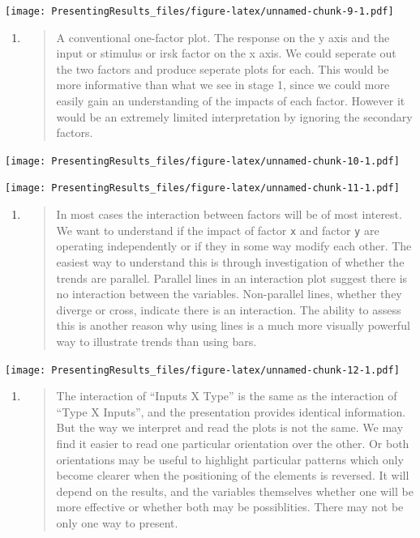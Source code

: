 \documentclass[
  titlepage]{book}
\begin{document}
\texttt{[image: PresentingResults\_files/figure-latex/unnamed-chunk-9-1.pdf]}

\begin{enumerate}
\def\labelenumi{\arabic{enumi}.}
\setcounter{enumi}{1}
\item
  \begin{quote}
  A conventional one-factor plot. The response on the y axis and the input or stimulus or irsk factor on the x axis.
  We could seperate out the two factors and produce seperate plots for each. This would be more informative than what we see in stage 1, since we could more easily gain an understanding of the impacts of each factor. However it would be an extremely limited interpretation by ignoring the secondary factors.
  \end{quote}
\end{enumerate}

\texttt{[image: PresentingResults\_files/figure-latex/unnamed-chunk-10-1.pdf]}

\texttt{[image: PresentingResults\_files/figure-latex/unnamed-chunk-11-1.pdf]}

\begin{enumerate}
\def\labelenumi{\arabic{enumi}.}
\setcounter{enumi}{2}
\item
  \begin{quote}
  In most cases the interaction between factors will be of most interest. We want to understand if the impact of factor \texttt{x} and factor \texttt{y} are operating independently or if they in some way modify each other. The easiest way to understand this is through investigation of whether the trends are parallel. Parallel lines in an interaction plot suggest there is no interaction between the variables. Non-parallel lines, whether they diverge or cross, indicate there is an interaction. The ability to assess this is another reason why using lines is a much more visually powerful way to illustrate trends than using bars.
  \end{quote}
\end{enumerate}

\texttt{[image: PresentingResults\_files/figure-latex/unnamed-chunk-12-1.pdf]}

\begin{enumerate}
\def\labelenumi{\arabic{enumi}.}
\setcounter{enumi}{3}
\item
  \begin{quote}
  The interaction of ``Inputs X Type'' is the same as the interaction of ``Type X Inputs'', and the presentation provides identical information. But the way we interpret and read the plots is not the same. We may find it easier to read one particular orientation over the other. Or both orientations may be useful to highlight particular patterns which only become clearer when the positioning of the elements is reversed. It will depend on the results, and the variables themselves whether one will be more effective or whether both may be possiblities. There may not be only one way to present.
  \end{quote}
\end{enumerate}
\end{document}
